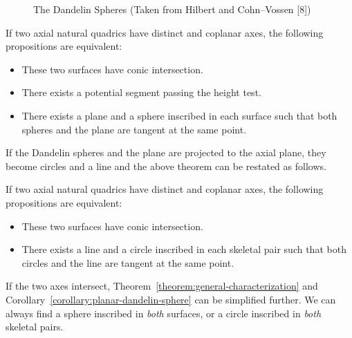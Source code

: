 \begin{figure}
\vspace{6cm}
\caption{The Dandelin Spheres (Taken from Hilbert and Cohn--Vossen [8])}
\label{fig:dandelin-sphere}
\end{figure}

\begin{theorem}
\label{theorem:general-characterization}
     If two axial natural quadrics have distinct and coplanar axes, the
following propositions are equivalent:
\begin{itemize}
     \item These two surfaces have conic intersection.
     \item There exists a potential segment passing the height test.
     \item There exists a plane and a sphere inscribed in each 
          surface such that both spheres and the plane are tangent 
          at the same point.
\end{itemize}
\end{theorem}

     If the Dandelin spheres and the plane are projected to the axial plane, 
they become circles and a line and the above theorem can be restated as 
follows.

\begin{corollary}
\label{corollary:planar-dandelin-sphere}
     If two axial natural quadrics have distinct and coplanar axes,  the
following propositions are equivalent:
\begin{itemize}
     \item These two surfaces have conic intersection.
     \item There exists a line and a circle inscribed in each skeletal pair
          such that both circles and the line are tangent at the same point.
\end{itemize}
\end{corollary}

     If the two axes intersect, Theorem~\ref{theorem:general-characterization}
and Corollary~\ref{corollary:planar-dandelin-sphere} can be simplified further.
We can always find a sphere inscribed in {\em both} surfaces, or a circle 
inscribed in {\em both} skeletal pairs.  

